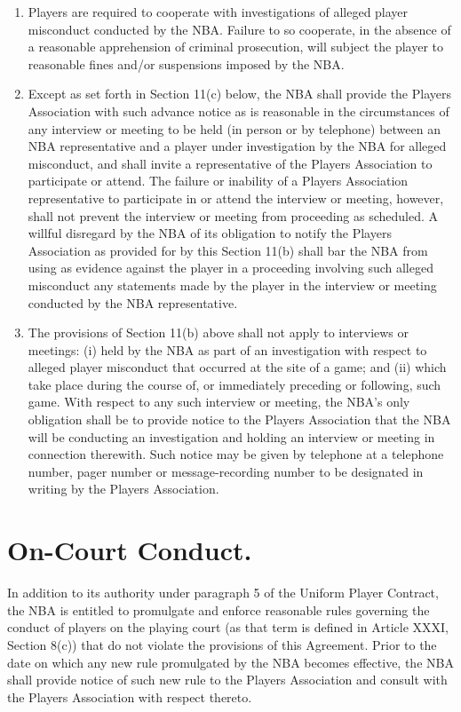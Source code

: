 \documentclass[
]{book}
\providecommand{\tightlist}{%
  \setlength{\itemsep}{0pt}\setlength{\parskip}{0pt}}
\begin{document}
\begin{enumerate}
\def\labelenumi{(\alph{enumi})}
\tightlist
\item
  Players are required to cooperate with investigations of alleged player misconduct conducted by the NBA. Failure to so cooperate, in the absence of a reasonable apprehension of criminal prosecution, will subject the player to reasonable fines and/or suspensions imposed by
  the NBA.
\item
  Except as set forth in Section 11(c) below, the NBA shall provide the Players Association with such advance notice as is reasonable in the circumstances of any interview or meeting to be held (in person or by telephone) between an NBA representative and a player under investigation by the NBA for alleged misconduct, and shall invite a representative of the Players Association to participate or attend. The failure or inability of a Players Association representative to participate in or attend the interview or meeting, however, shall not prevent the interview or meeting from proceeding as scheduled. A willful disregard by the NBA of its obligation to notify the Players Association as provided for by this Section 11(b) shall bar the NBA from using as evidence against the player in a proceeding involving such alleged misconduct any statements made by the player in the interview or meeting conducted by the NBA representative.
\item
  The provisions of Section 11(b) above shall not apply to interviews or meetings: (i) held by the NBA as part of an investigation with respect to alleged player misconduct that occurred at the site of a game; and (ii) which take place during the course of, or immediately preceding or following, such game. With respect to any such interview or meeting, the NBA's only obligation shall be to provide notice to the Players Association that the NBA will be conducting an investigation and holding an interview or meeting in connection therewith. Such notice may be given by telephone at a telephone number, pager number or message-recording number to be designated in writing by the Players Association.
\end{enumerate}

\hypertarget{on-court-conduct.}{%
\section{On-Court Conduct.}\label{on-court-conduct.}}

In addition to its authority under paragraph 5 of the Uniform Player Contract, the NBA is entitled to promulgate and enforce reasonable rules governing the conduct of players on the playing court (as that term is defined in Article XXXI, Section 8(c)) that do not violate the provisions of this Agreement. Prior to the date on which any new rule promulgated by the NBA becomes effective, the NBA shall provide notice of such new rule to the Players Association and consult with the Players Association with respect thereto.
\end{document}
